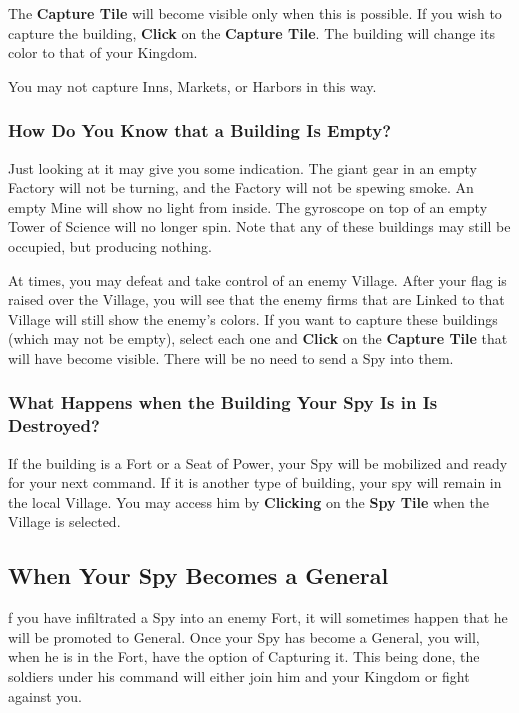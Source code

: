 The \textbf{Capture Tile} will become visible only when this is possible. If you wish to capture the building, \textbf{Click} on the \textbf{Capture Tile}. The building will change its color to that of your Kingdom.

You may not capture Inns, Markets, or Harbors in this way.

\subsubsection{How Do You Know that a Building Is Empty?}

Just looking at it may give you some indication. The giant gear in an empty Factory will not be turning, and the Factory will not be spewing smoke. An empty Mine will show no light from inside. The gyroscope on top of an empty Tower of Science will no longer spin. Note that any of these buildings may still be occupied, but producing nothing.

At times, you may defeat and take control of an enemy Village. After your flag is raised over the Village, you will see that the enemy firms that are Linked to that Village will still show the enemy’s colors. If you want to capture these buildings (which may not be empty), select each one and \textbf{Click} on the \textbf{Capture Tile} that will have become visible. There will be no need to send a Spy into them.

\subsubsection{What Happens when the Building Your Spy Is in Is Destroyed?}

If the building is a Fort or a Seat of Power, your Spy will be mobilized and ready for your next command. If it is another type of building, your spy will remain in the local Village. You may access him by \textbf{Clicking} on the \textbf{Spy Tile} when the Village is selected.

\subsection{When Your Spy Becomes a General}


f you have infiltrated a Spy into an enemy Fort, it will sometimes happen that he will be promoted to General. Once your Spy has become a General, you will, when he is in the Fort, have the option of Capturing it. This being done, the soldiers under his command will either join him and your Kingdom or fight against you.

